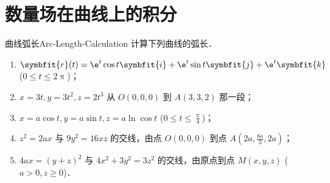 \section{数量场在曲线上的积分}

\begin{problem}{曲线弧长}{Arc-Length-Calculation}
    计算下列曲线的弧长．
    \begin{enumerate}
        \item $\symbfit{r}(t) = \e^t \cos t \symbfit{i} + \e^t \sin t \symbfit{j} + \e^t \symbfit{k}$ ($0 \le t \le 2\uppi$)；
        \item $x = 3t, y = 3t^2, z = 2t^3$ 从 $O(0,0,0)$ 到 $A(3,3,2)$ 那一段；
        \item $x = a \cos t, y = a \sin t, z = a \ln \cos t$ ($0 \le t \le \frac{\uppi}{4}$)；
        \item $z^2 = 2ax$ 与 $9y^2 = 16xz$ 的交线，由点 $O(0,0,0)$ 到点 $A(2a, \frac{8a}{3}, 2a)$；
        \item $4ax = (y+z)^2$ 与 $4x^2 + 3y^2 = 3z^2$ 的交线，由原点到点 $M(x,y,z)$ ($a > 0, z \ge 0$)．
    \end{enumerate}
\end{problem}

